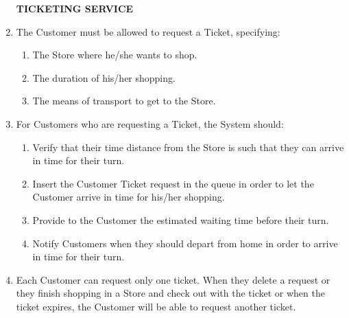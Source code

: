 \documentclass[a4paper, 10pt, oneside]{article}
\begin{document}
\begin{enumerate}[align=left]
    \item[\textbf{TICKETING SERVICE}]
    \item \label{req:requestTicket} The Customer must be allowed to request a Ticket, specifying:
     \begin{enumerate}[label={-}]
        \item \label{req:requestTicket:store} The Store where he/she wants to shop.
        \item \label{req:requestTicket:duration}The duration of his/her shopping.
        \item \label{req:requestTicket:transport}The means of transport to get to the Store.
    \end{enumerate}
    \item \label{req:systemTicket}For Customers who are requesting a Ticket, the System should:
    \begin{enumerate}[label={-}]
        \item \label{req:systemTicket:verifyDist} Verify that their time distance from the Store is such that they can arrive in time for their turn.
        \item \label{req:systemTicket:addInQueue}Insert the Customer Ticket request in the queue in order to let the Customer arrive in time for his/her shopping.
        \item \label{req:systemTicket:waitingTime} Provide to the Customer the estimated waiting time before their turn.
        \item \label{req:systemTicket:notifForDepart} Notify Customers when they should depart from home in order to arrive in time for their turn.
    \end{enumerate}
    \item \label{req:numberTicketPerCust} Each Customer can request only one ticket. When they delete a request or they finish shopping in a Store and check out with the ticket or when the ticket expires, the Customer will be able to request another ticket.
    

\end{enumerate}
\end{document}
